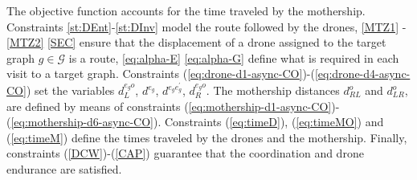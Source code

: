 \documentclass[10pt,a4paper]{elsarticle}
\newcommand{\EN}[1]{{\color{black}#1}}
\begin{document}
\noindent
The objective function accounts for the time traveled by the mothership. Constraints \eqref{st:DEnt}-\eqref{st:DInv} model the route followed by the drones, \eqref{MTZ1} - \eqref{MTZ2}  \eqref{SEC} ensure that the displacement of a drone  assigned to the target graph $g\in\mathcal G$ is a route, \eqref{eq:alpha-E}  \eqref{eq:alpha-G} define what is required in each visit to a target graph. Constraints (\ref{eq:drone-d1-async-CO})-(\ref{eq:drone-d4-async-CO}) set the variables $d_L^{e_go}$, $d^{e_g}$, $d^{e_ge^\prime_g}$, $d_R^{e_go}$.
The mothership distances $d_{RL}^o$ and $d_{LR}^o$, are defined by means of constraints (\ref{eq:mothership-d1-async-CO})-(\ref{eq:mothership-d6-async-CO}). Constraints (\ref{eq:timeD}), (\ref{eq:timeMO}) and (\ref{eq:timeM}) define the \EN{times traveled} by the drones and the mothership. Finally, constraints (\ref{DCW})-(\ref{CAP}) guarantee that the coordination and drone endurance are satisfied. 
\end{document}
